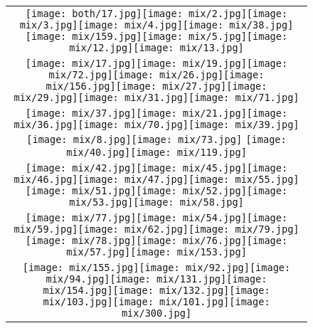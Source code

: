 \documentclass[a4paper, 10pt, conference]{ieeeconf}      %
\begin{document}
\begin{figure}[h]
\centering
\begin{tabular}{ c  }

\texttt{[image: both/17.jpg]}\texttt{[image: mix/2.jpg]}\texttt{[image: mix/3.jpg]}\texttt{[image: mix/4.jpg]}\texttt{[image: mix/38.jpg]}\texttt{[image: mix/159.jpg]}\texttt{[image: mix/5.jpg]}\texttt{[image: mix/12.jpg]}\texttt{[image: mix/13.jpg]}\\

\texttt{[image: mix/17.jpg]}\texttt{[image: mix/19.jpg]}\texttt{[image: mix/72.jpg]}\texttt{[image: mix/26.jpg]}\texttt{[image: mix/156.jpg]}\texttt{[image: mix/27.jpg]}\texttt{[image: mix/29.jpg]}\texttt{[image: mix/31.jpg]}\texttt{[image: mix/71.jpg]}\\

\texttt{[image: mix/37.jpg]}\texttt{[image: mix/21.jpg]}\texttt{[image: mix/36.jpg]}\texttt{[image: mix/70.jpg]}\texttt{[image: mix/39.jpg]}\texttt{[image: mix/8.jpg]}\texttt{[image: mix/73.jpg]}
\texttt{[image: mix/40.jpg]}\texttt{[image: mix/119.jpg]}\\

\texttt{[image: mix/42.jpg]}\texttt{[image: mix/45.jpg]}\texttt{[image: mix/46.jpg]}\texttt{[image: mix/47.jpg]}\texttt{[image: mix/55.jpg]}\texttt{[image: mix/51.jpg]}\texttt{[image: mix/52.jpg]}\texttt{[image: mix/53.jpg]}\texttt{[image: mix/58.jpg]}\\

\texttt{[image: mix/77.jpg]}\texttt{[image: mix/54.jpg]}\texttt{[image: mix/59.jpg]}\texttt{[image: mix/62.jpg]}\texttt{[image: mix/79.jpg]}\texttt{[image: mix/78.jpg]}\texttt{[image: mix/76.jpg]}\texttt{[image: mix/57.jpg]}\texttt{[image: mix/153.jpg]}\\

\texttt{[image: mix/155.jpg]}\texttt{[image: mix/92.jpg]}\texttt{[image: mix/94.jpg]}\texttt{[image: mix/131.jpg]}\texttt{[image: mix/154.jpg]}\texttt{[image: mix/132.jpg]}\texttt{[image: mix/103.jpg]}\texttt{[image: mix/101.jpg]}\texttt{[image: mix/300.jpg]}\\


\end{tabular}
\end{figure}
\end{document}
